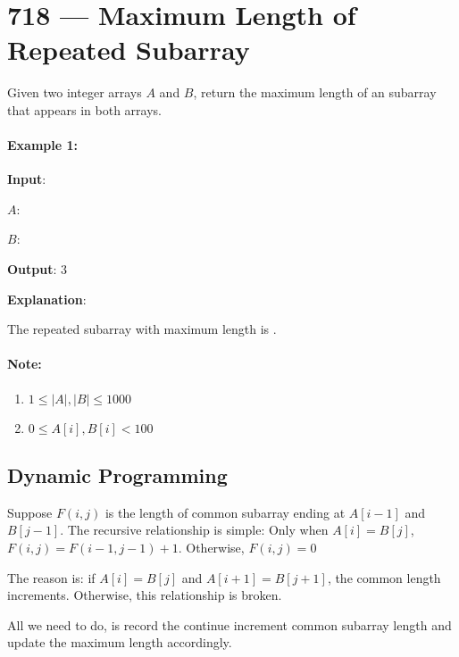 \section{718 --- Maximum Length of Repeated Subarray}
Given two integer arrays $A$ and $B$, return the maximum length of an subarray that appears in both arrays.

\paragraph{Example 1:}

\textbf{Input}:

\begin{flushleft}
$A$: \fcj{[1,2,3,2,1]}

$B$: \fcj{[3,2,1,4,7]}

\textbf{Output}: 3

\textbf{Explanation}: 

The repeated subarray with maximum length is \fcj{[3, 2, 1]}.

\end{flushleft}
 

\paragraph{Note:}

\begin{enumerate}
\item $1 \leq \lvert A\rvert, \lvert B\rvert \leq 1000$
\item $0 \leq A[i], B[i] < 100$
\end{enumerate}

\subsection{Dynamic Programming}

Suppose $F(i, j)$ is the length of common subarray ending at $A[i-1]$ and $B[j-1]$. The recursive relationship is simple: Only when $A[i] = B[j]$, $F(i, j) = F(i-1, j-1) +1 $. Otherwise, $F(i, j) = 0$

The reason is: if $A[i] = B[j] $ and $A[i+1]=B[j+1]$, the common length increments. Otherwise, this relationship is broken.

All we need to do, is record the continue increment common subarray length and update the maximum length accordingly.

